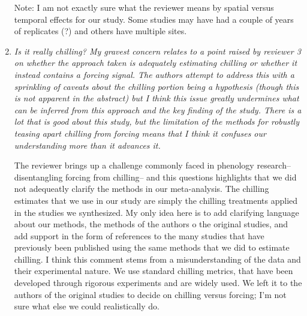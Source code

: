 \documentclass[11pt, a4paper]{article}
\begin{document}
\begin{enumerate}
\par Note: I am not exactly sure what the reviewer means by spatial versus temporal effects for our study. Some studies may have had a couple of years of replicates (?) and others have multiple sites. 
\item \emph{ Is it really chilling? My gravest concern relates to a point raised by reviewer 3 on whether the
approach taken is adequately estimating chilling or whether it instead contains a forcing signal.
The authors attempt to address this with a sprinkling of caveats about the chilling portion
being a hypothesis (though this is not apparent in the abstract) but I think this issue greatly
undermines what can be inferred from this approach and the key finding of the study. There is
a lot that is good about this study, but the limitation of the methods for robustly teasing apart
chilling from forcing means that I think it confuses our understanding more than it advances it.}
\par The reviewer brings up a challenge commonly faced in phenology research-- disentangling forcing from chilling-- and this questions highlights that we did not adequeatly clarify the methods in our meta-analysis. The chilling estimates that we use in our study are simply the chilling treatments applied in the studies we synthesized. My only idea here is to add clarifying language about our methods, the methods of the authors o the original studies, and add support in the form of references to the many studies that have previously been published using the same methods that we did to estimate chilling. I think this comment stems from a misunderstanding of the data and their experimental nature. We use standard chilling metrics, that have been developed through rigorous experiments and are widely used. We left it to the authors of the original studies to decide on chilling versus forcing; I'm not sure what else we could realistically do. 


\end{enumerate}
\end{document}
